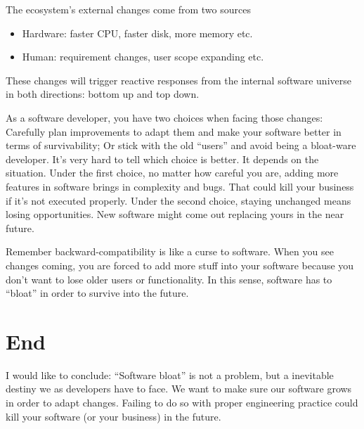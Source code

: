 \documentclass[a4paper, 11pt]{article}
\begin{document}
\begin{center}
\end{center}

The ecosystem's external changes come from two sources
\begin{itemize}
\item Hardware: faster CPU, faster disk, more memory etc.
\item Human: requirement changes, user scope expanding etc.
\end{itemize}
These changes will trigger reactive responses from the internal
software universe in both directions: bottom up and top down.

As a software developer, you have two choices when facing those
changes: Carefully plan improvements to adapt them and make your
software better in terms of survivability; Or stick with the old
``users'' and avoid being a bloat-ware developer. It's very hard to
tell which choice is better. It depends on the situation. Under the
first choice, no matter how careful you are, adding more features in
software brings in complexity and bugs. That could kill your business
if it's not executed properly. Under the second choice, staying
unchanged means losing opportunities. New software might come out
replacing yours in the near future.

Remember backward-compatibility is like a curse to software. When you
see changes coming, you are forced to add more stuff into your
software because you don't want to lose older users or
functionality. In this sense, software has to ``bloat'' in order to
survive into the future.

\section*{End}

I would like to conclude: ``Software bloat'' is not a problem, but a
inevitable destiny we as developers have to face. We want to make sure
our software grows in order to adapt changes. Failing to do so with
proper engineering practice could kill your software (or your
business) in the future.
\end{document}

